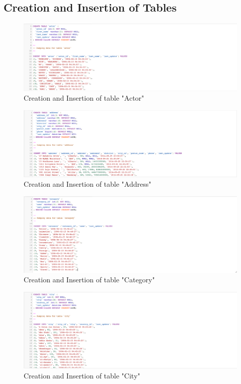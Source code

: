 \documentclass[openany]{article}
\begin{document}
\subsection{Creation and Insertion of Tables}
	\begin{figure}[H]
		\includegraphics[width=\textwidth]{table_actor_cins}
		\caption{Creation and Insertion of table "Actor"}	
	\end{figure}
	\begin{figure}[H]
		\includegraphics[width=\textwidth]{table_address_cins}
		\caption{Creation and Insertion of table "Address"}	
	\end{figure}
	\begin{figure}[H]
		\includegraphics[width=\textwidth]{table_category_cins}
		\caption{Creation and Insertion of table "Category"}	
	\end{figure}
	\begin{figure}[H]
		\includegraphics[width=\textwidth]{table_city_cins}
		\caption{Creation and Insertion of table "City"}	
	\end{figure}
\end{document}
